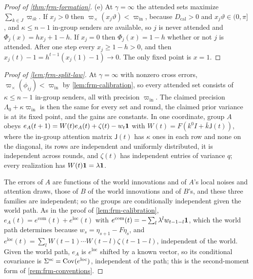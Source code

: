\begin{proof}[Proof of \cref{thm:frm-formation}]
(e) At $\gamma=\infty$ the attended sets maximize $\sum_{k\in J}\varpi_{ik}$. If $x_j>0$ then $\varpi_\times(x_j\vartheta)<\varpi_{\mathrm{in}}$, because $D_{\mathrm{cal}}>0$ and $x_j\vartheta\in(0,\pi]$, and $\kappa\le n-1$ in-group senders are available, so $j$ is never attended and $\Phi_j(x)=hx_j+1-h$. If $x_j=0$ then $\Phi_j(x)=1-h$ whether or not $j$ is attended. After one step every $x_j\ge1-h>0$, and then $x_j(t)-1=h^{t-1}(x_j(1)-1)\to0$. The only fixed point is $x=1$.
\end{proof}

\begin{proof}[Proof of \cref{lem:frm-split-law}]
At $\gamma=\infty$ with nonzero cross errors, $\varpi_\times(\phi_{ij})<\varpi_{\mathrm{in}}$ by \cref{lem:frm-calibration}, so every attended set consists of $\kappa\le n-1$ in-group senders, all with precision $\varpi_{\mathrm{in}}$. The claimed precision $\Lambda_0+\kappa\varpi_{\mathrm{in}}$ is then the same for every set and round, the claimed prior variance is at its fixed point, and the gains are constants. In one coordinate, group $A$ obeys $e_A(t+1)=W(t)e_A(t)+\zeta(t)-w_t\mathbf{1}$ with $W(t)=F(k^0I+\bar k\mathsf J(t))$, where the in-group attention matrix $\mathsf J(t)$ has $\kappa$ ones in each row and none on the diagonal, its rows are independent and uniformly distributed, it is independent across rounds, and $\zeta(t)$ has independent entries of variance $q$; every realization has $W(t)\mathbf{1}=\lambda\mathbf{1}$.

The errors of $A$ are functions of the world innovations and of $A$'s local noises and attention draws, those of $B$ of the world innovations and of $B$'s, and these three families are independent; so the groups are conditionally independent given the world path. As in the proof of \cref{lem:frm-calibration}, $e_A(t)=e^{\mathrm{com}}(t)+e^{\mathrm{loc}}(t)$ with $e^{\mathrm{com}}(t)=-\sum_l\lambda^lw_{t-1-l}\mathbf{1}$, which the world path determines because $w_s=\eta_{s+1}-F\eta_s$, and $e^{\mathrm{loc}}(t)=\sum_lW(t-1)\cdots W(t-l)\zeta(t-1-l)$, independent of the world. Given the world path, $e_A$ is $e^{\mathrm{loc}}$ shifted by a known vector, so its conditional covariance is $\Sigma^{\mathrm{sc}}=\operatorname{Cov}(e^{\mathrm{loc}})$, independent of the path; this is the second-moment form of \cref{rem:frm-conventions}.


\end{proof}
